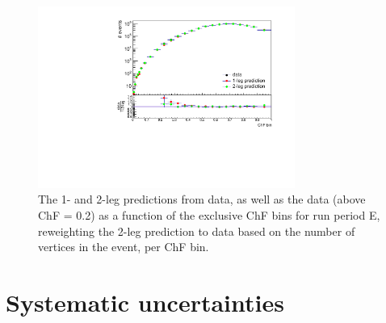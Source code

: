 \begin{figure}[ht]
  \centering
  \includegraphics[width=0.75\textwidth]{figures/data_vs_prediction_RunE_reweighted_exclusivebinning.pdf}\hfill%
  \caption{The 1- and 2-leg predictions from data, as well as the data (above ChF = 0.2) as a function of the exclusive ChF bins for run period E, reweighting the 2-leg prediction to data based on the number of vertices in the event, per ChF bin.}
  \label{fig:BF_reweighted}
\end{figure}

\section{Systematic uncertainties}
\label{sec:SIMP_systematics}

